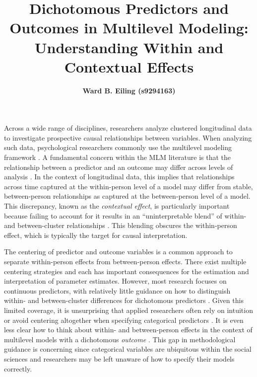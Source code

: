 \documentclass[stu]{apa7}
\title{Dichotomous Predictors and Outcomes in Multilevel Modeling: Understanding Within and Contextual Effects}
\author{\textbf{Ward B. Eiling (s9294163)} \vspace{1cm}}
\begin{document}
\maketitle



Across a wide range of disciplines, researchers analyze clustered longitudinal data to investigate prospective causal relationships between variables. When analyzing such data, psychological researchers commonly use the multilevel modeling framework \parencite[MLM,][]{bauer_fitting_2011}. A fundamental concern within the MLM literature is that the relationship between a predictor and an outcome may differ across levels of analysis \parencite[e.g.,][]{enders_centering_2007, kreft_effect_1995, raudenbush_hierarchical_2002}. In the context of longitudinal data, this implies that relationships across time captured at the within-person level of a model may differ from stable, between-person relationships as captured at the between-person level of a model. This discrepancy, known as the \textit{contextual effect}, is particularly important because failing to account for it results in an ``uninterpretable blend'' of within- and between-cluster relationships \parencite[139]{raudenbush_hierarchical_2002}. This blending obscures the within-person effect, which is typically the target for causal interpretation.


The centering of predictor and outcome variables is a common approach to separate within-person effects from between-person effects. There exist multiple centering strategies and each has important consequences for the estimation and interpretation of parameter estimates. However, most research focuses on continuous predictors, with relatively little guidance on how to distinguish within- and between-cluster differences for dichotomous predictors \parencite[for brief treatments, see][]{yaremych_centering_2023, enders_centering_2007, raudenbush_hierarchical_2002}. Given this limited coverage, it is unsurprising that applied researchers often rely on intuition or avoid centering altogether when specifying categorical predictors \parencite{yaremych_centering_2023}. It is even less clear how to think about within- and between-person effects in the context of multilevel models with a dichotomous \textit{outcome} \parencite[However, see][]{austin_intermediate_2017, bolger_modeling_2013}. This gap in methodological guidance is concerning since categorical variables are ubiquitous within the social sciences and researchers may be left unaware of how to specify their models correctly. 
\end{document}
